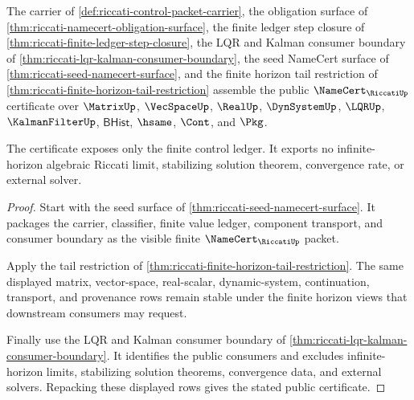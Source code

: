 \begin{theorem}
\label{thm:riccati-public-finite-ledger-certificate}
The carrier of \autoref{def:riccati-control-packet-carrier}, the obligation
surface of \autoref{thm:riccati-namecert-obligation-surface}, the finite ledger
step closure of \autoref{thm:riccati-finite-ledger-step-closure}, the LQR and
Kalman consumer boundary of \autoref{thm:riccati-lqr-kalman-consumer-boundary},
the seed NameCert surface of \autoref{thm:riccati-seed-namecert-surface}, and
the finite horizon tail restriction of
\autoref{thm:riccati-finite-horizon-tail-restriction} assemble the public
$\NameCert_{\RiccatiUp}$ certificate over $\MatrixUp$, $\VecSpaceUp$, $\RealUp$,
$\DynSystemUp$, $\LQRUp$, $\KalmanFilterUp$, $\mathsf{BHist}$, $\hsame$,
$\Cont$, and $\Pkg$.

The certificate exposes only the finite control ledger. It exports no
infinite-horizon algebraic Riccati limit, stabilizing solution theorem,
convergence rate, or external solver.
\end{theorem}
\begin{proof}
Start with the seed surface of
\autoref{thm:riccati-seed-namecert-surface}. It packages the carrier,
classifier, finite value ledger, component transport, and consumer boundary as
the visible finite $\NameCert_{\RiccatiUp}$ packet.

Apply the tail restriction of
\autoref{thm:riccati-finite-horizon-tail-restriction}. The same displayed
matrix, vector-space, real-scalar, dynamic-system, continuation, transport, and
provenance rows remain stable under the finite horizon views that downstream
consumers may request.

Finally use the LQR and Kalman consumer boundary of
\autoref{thm:riccati-lqr-kalman-consumer-boundary}. It identifies the public
consumers and excludes infinite-horizon limits, stabilizing solution theorems,
convergence data, and external solvers. Repacking these displayed rows gives
the stated public certificate.
\end{proof}

